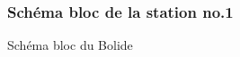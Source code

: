 \begin{figure}[hbtp]
\subsubsection{Schéma bloc de la station no.1}
\caption{Schéma bloc du Bolide}
\centering
{}
\end{figure}
\vfill